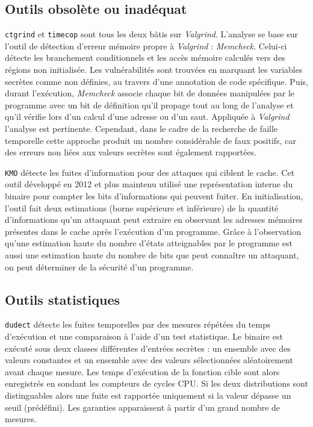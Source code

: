 \subsection*{Outils obsolète ou inadéquat}

\texttt{ctgrind} et \texttt{timecop} sont tous les deux bâtis sur \textit{Valgrind}. L'analyse se base sur l'outil de détection d'erreur mémoire propre à \textit{Valgrind} : \textit{Memcheck}. Celui-ci détecte les branchement conditionnels et les accès mémoire calculés vers des régions non initialisée. Les vulnérabilités sont trouvées en marquant les variables secrètes comme non définies, au travers d'une annotation de code spécifique. Puis, durant l'exécution, \textit{Memcheck} associe chaque bit de données manipulées par le programme avec un bit de définition qu'il propage tout au long de l'analyse et qu'il vérifie lors d'un calcul d'une adresse ou d'un saut. Appliquée à \textit{Valgrind} l'analyse est pertinente. Cependant, dans le cadre de la recherche de faille temporelle cette approche produit un nombre considérable de faux positifs, car des erreurs non liées aux valeurs secrètes sont également rapportées.\medbreak


\texttt{KMO} détecte les fuites d'information pour des attaques qui ciblent le cache. Cet outil développé en 2012 et plus maintenu utilisé une représentation interne du binaire pour compter les bits d'informations qui peuvent fuiter. En initialisation, l'outil fait deux estimations (borne supérieure et inférieure) de la quantité d'informations qu'un attaquant peut extraire en observant les adresses mémoires présentes dans le cache après l'exécution d'un programme. Grâce à l'observation qu'une estimation haute du nombre d'états atteignables par le programme est aussi une estimation haute du nombre de bits que peut connaître un attaquant, on peut déterminer de la sécurité d'un programme.


\subsection*{Outils statistiques}

\texttt{dudect} détecte les fuites temporelles par des mesures répétées du temps d'exécution et une comparaison à l'aide d'un test statistique. Le binaire est exécuté sous deux classes différentes d'entrées secrètes : un ensemble avec des valeurs constantes et un ensemble avec des valeurs sélectionnées aléatoirement avant chaque mesure. Les temps d'exécution de la fonction cible sont alors enregistrés en sondant les compteurs de cycles CPU. Si les deux distributions sont distinguables alors une fuite est rapportée uniquement si la valeur dépasse un seuil (prédéfini). Les garanties apparaissent à partir d'un grand nombre de mesures.\medbreak

